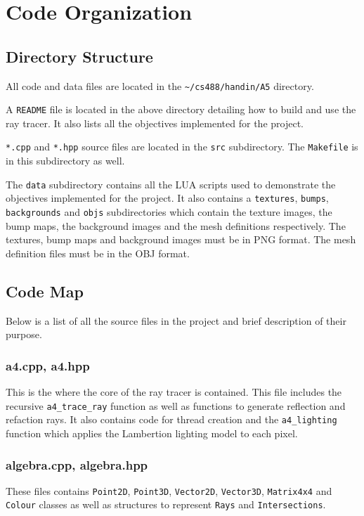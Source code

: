 \chapter{Code Organization}

\section{Directory Structure}
All code and data files are located in the \verb|~/cs488/handin/A5| directory.

A \verb|README| file is located in the above directory detailing how to build
and use the ray tracer. It also lists all the objectives implemented for the
project.

\verb|*.cpp| and \verb|*.hpp| source files are located in the \verb|src| 
subdirectory. The \verb|Makefile| is in this subdirectory as well.

The \verb|data| subdirectory contains all the LUA scripts used to demonstrate
the objectives implemented for the project. It also contains a \verb|textures|,
\verb|bumps|, \verb|backgrounds| and \verb|objs| subdirectories which contain
the texture images, the bump maps, the background images and the mesh
definitions respectively. The textures, bump maps and background images must be
in PNG format. The mesh definition files must be in the OBJ format.

\section{Code Map}
Below is a list of all the source files in the project and brief description of
their purpose.

\subsection*{a4.cpp, a4.hpp}
This is the where the core of the ray tracer is contained. This file includes
the recursive \verb|a4_trace_ray| function as well as functions to generate
reflection and refaction rays. It also contains code for thread creation and the
\verb|a4_lighting| function which applies the Lambertion lighting model to each
pixel.

\subsection*{algebra.cpp, algebra.hpp}
These files contains \verb|Point2D|, \verb|Point3D|, \verb|Vector2D|,
\verb|Vector3D|, \newline \verb|Matrix4x4| and \verb|Colour| classes as well as 
structures to represent \verb|Rays| and \verb|Intersections|.

